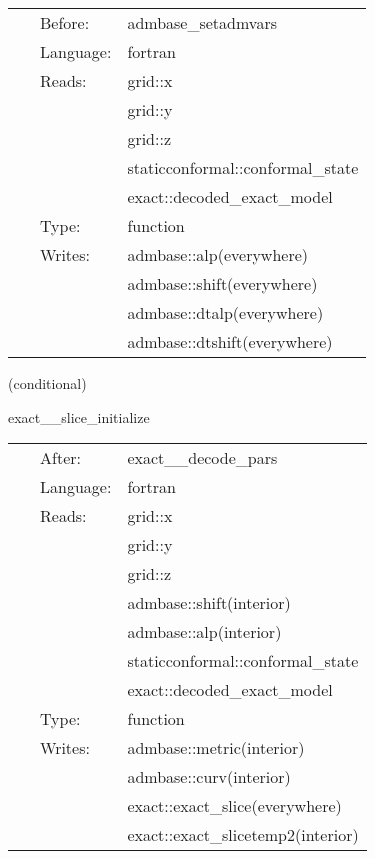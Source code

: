 \hspace{5mm}{\it set evolution lapse and/or shift from exact solution on a trivial slice } 


\hspace{5mm}

 \begin{tabular*}{160mm}{cll} 
~ & Before:  & admbase\_setadmvars \\ 
~ & Language:  & fortran \\ 
~ & Reads:  & grid::x \\ 
~& ~ &grid::y\\ 
~& ~ &grid::z\\ 
~& ~ &staticconformal::conformal\_state\\ 
~& ~ &exact::decoded\_exact\_model\\ 
~ & Type:  & function \\ 
~ & Writes:  & admbase::alp(everywhere) \\ 
~& ~ &admbase::shift(everywhere)\\ 
~& ~ &admbase::dtalp(everywhere)\\ 
~& ~ &admbase::dtshift(everywhere)\\ 
\end{tabular*} 


\vspace{5mm}

   (conditional) 

\hspace{5mm} exact\_\_slice\_initialize 

\hspace{5mm}{\it set initial data from exact solution on arbitrary slice } 


\hspace{5mm}

 \begin{tabular*}{160mm}{cll} 
~ & After:  & exact\_\_decode\_pars \\ 
~ & Language:  & fortran \\ 
~ & Reads:  & grid::x \\ 
~& ~ &grid::y\\ 
~& ~ &grid::z\\ 
~& ~ &admbase::shift(interior)\\ 
~& ~ &admbase::alp(interior)\\ 
~& ~ &staticconformal::conformal\_state\\ 
~& ~ &exact::decoded\_exact\_model\\ 
~ & Type:  & function \\ 
~ & Writes:  & admbase::metric(interior) \\ 
~& ~ &admbase::curv(interior)\\ 
~& ~ &exact::exact\_slice(everywhere)\\ 
~& ~ &exact::exact\_slicetemp2(interior)\\ 
\end{tabular*} 


